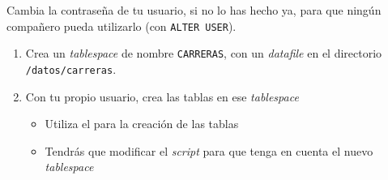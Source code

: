 \begin{homeworkProblem}
  Cambia la contraseña de tu usuario, si no lo has hecho ya, para que ningún compañero pueda utilizarlo (con \texttt{ALTER USER}).

  \begin{enumerate}
  \item Crea un \textit{tablespace} de nombre \texttt{CARRERAS}, con un \textit{datafile} en el directorio \texttt{/datos/carreras}.
  \item Con tu propio usuario, crea las tablas en ese \textit{tablespace}
    \begin{itemize}
    \item Utiliza el  para la creación de las tablas
    \item Tendrás que modificar el \textit{script} para que tenga en cuenta el nuevo \textit{tablespace}
    \end{itemize}
  \end{enumerate}
\end{homeworkProblem}

